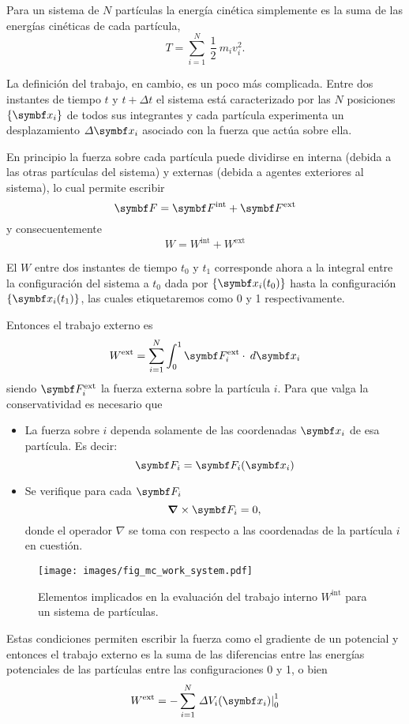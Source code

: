 \documentclass[10pt,oneside]{CBFT_book}
\begin{document}
Para un sistema de $ N $ partículas la energía cinética simplemente es la suma de las energías cinéticas de cada 
partícula,
\[
	T = \sum_{i=1}^N \: \frac{1}{2} \: m_i v_i^2.
\]

La definición del trabajo, en cambio, es un poco más complicada. Entre dos instantes de tiempo $ t $ y $ t + \Delta t $ 
el sistema está caracterizado por las $ N $ posiciones $ \{\vb{x}_i\} $ de todos sus integrantes y cada partícula 
experimenta un desplazamiento $ \Delta \vb{x}_i $ asociado con la fuerza que actúa sobre ella.

En principio la fuerza sobre cada partícula puede dividirse en interna (debida a las otras partículas del sistema) y 
externas (debida a agentes exteriores al sistema), lo cual permite escribir
\[
	\vb{F} = \vb{F}^{\text{int}} + \vb{F}^{\text{ext}}
\]
y consecuentemente
\[
	W = W^{\text{int}} + W^{\text{ext}}
\]

El $ W $ entre dos instantes de tiempo $t_0$ y $t_1$ corresponde ahora a la integral entre la configuración del sistema 
a $t_0$ dada por $ \{\vb{x}_i(t_0)\} $ hasta la configuración $ \{\vb{x}_i(t_1)\} $, las cuales etiquetaremos como 0 y 
1 respectivamente. 

Entonces el trabajo externo es
\[
	W^{\text{ext}} = \sum_{i=1}^N \int_0^1 \vb{F}^{\text{ext}}_i \cdot \: d\vb{x}_i
\]
siendo $ \vb{F}^{\text{ext}}_i $ la fuerza externa sobre la partícula $i$. Para que valga la conservatividad es 
necesario que 
\begin{itemize}
 \item La fuerza sobre $i$ dependa solamente de las coordenadas $\vb{x}_i$ de esa partícula. Es decir:
 \[
	\vb{F}_i = \vb{F}_i(\vb{x}_i)
 \]
 \item Se verifique para cada $\vb{F}_i$ 
 \[
	\Nabla \times \vb{F}_i = 0,
 \]
 donde el operador $\nabla$ se toma con respecto a las coordenadas de la partícula $i$ en cuestión.
\end{itemize}

\begin{figure}[!ht]
	\begin{center}
	\texttt{[image: images/fig\_mc\_work\_system.pdf]}	
	\end{center}
	\caption{Elementos implicados en la evaluación del trabajo interno $ W^{\text{int}} $ para un sistema
	de partículas.}
	\label{fig_mc_work_system}
\end{figure} 

Estas condiciones permiten escribir la fuerza como el gradiente de un potencial y entonces el trabajo externo es la 
suma de las diferencias entre las energías potenciales de las partículas entre las configuraciones 0 y 1, o bien
\[
	W^{\text{ext}} = - \sum_{i=1}^N \left. \Delta V_i(\vb{x}_i) \right|_0^1
\]
\end{document}
